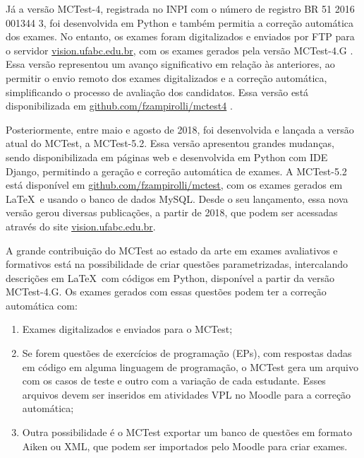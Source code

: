 Já a versão MCTest-4, registrada no INPI com o número de registro BR 51 2016 001344 3, foi desenvolvida em Python e também permitia a correção automática dos exames. No entanto, os exames foram digitalizados e enviados por FTP para o servidor \href{http://vision.ufabc.edu.br}{vision.ufabc.edu.br}, com os exames gerados pela versão MCTest-4.G \cite{2016:Zampirolli.Batista.ea}. Essa versão representou um avanço significativo em relação às anteriores, ao permitir o envio remoto dos exames digitalizados e a correção automática, simplificando o processo de avaliação dos candidatos. Essa versão está disponibilizada em \href{https://github.com/fzampirolli/mctest4}{github.com/fzampirolli/mctest4} \cite{2016:Zampirolli.Batista.ea}.

Posteriormente, entre maio e agosto de 2018, foi desenvolvida e lançada a versão atual do MCTest, a MCTest-5.2. Essa versão apresentou grandes mudanças, sendo disponibilizada em páginas web e desenvolvida em Python com IDE Django, permitindo a geração e correção automática de exames. A MCTest-5.2 está disponível em  \href{https://github.com/fzampirolli/mctest}{github.com/fzampirolli/mctest}, com os exames gerados em \LaTeX \ e usando o banco de dados MySQL. Desde o seu lançamento, essa nova versão gerou diversas publicações, a partir de 2018, que podem ser acessadas através do site \href{http://vision.ufabc.edu.br}{vision.ufabc.edu.br}. 

A grande contribuição do MCTest ao estado da arte em exames avaliativos e formativos está na possibilidade de criar questões parametrizadas, intercalando descrições em \LaTeX \ com códigos em Python, disponível a partir da versão MCTest-4.G. Os exames gerados com essas questões podem ter a correção automática com: 

\begin{enumerate}
    \item Exames digitalizados e enviados para o MCTest; 
    \item Se forem questões de exercícios de programação (EPs), com respostas dadas em código em alguma linguagem de programação, o MCTest gera um arquivo com os casos de teste e outro com a variação de cada estudante. Esses arquivos devem ser inseridos em atividades VPL no Moodle para a correção automática; 
    \item Outra possibilidade é o MCTest exportar um banco de questões em formato Aiken ou XML, que podem ser importados pelo Moodle para criar exames. 
\end{enumerate}

